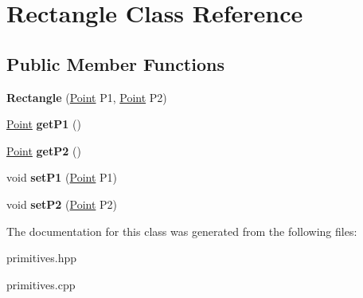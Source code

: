 \hypertarget{classRectangle}{}\section{Rectangle Class Reference}
\label{classRectangle}
\subsection*{Public Member Functions}
\begin{DoxyCompactItemize}
\item 
\mbox{\label{classRectangle_aba42081791fdbb36a1b4eed965a54f21}} 
{\bfseries Rectangle} (\hyperlink{classPoint}{Point} P1, \hyperlink{classPoint}{Point} P2)
\item 
\mbox{\label{classRectangle_af5921ae0f9a77de0c2c997de12ea455c}} 
\hyperlink{classPoint}{Point} {\bfseries get\+P1} ()
\item 
\mbox{\label{classRectangle_a1d4d588ff110b227eda59faa2e95aa27}} 
\hyperlink{classPoint}{Point} {\bfseries get\+P2} ()
\item 
\mbox{\label{classRectangle_a6c1286b0633817ee5b9b3fd5395c97b1}} 
void {\bfseries set\+P1} (\hyperlink{classPoint}{Point} P1)
\item 
\mbox{\label{classRectangle_a7049caae9f8e6850a18bbd629c8b1db6}} 
void {\bfseries set\+P2} (\hyperlink{classPoint}{Point} P2)
\end{DoxyCompactItemize}


The documentation for this class was generated from the following files\+:\begin{DoxyCompactItemize}
\item 
primitives.\+hpp\item 
primitives.\+cpp\end{DoxyCompactItemize}
